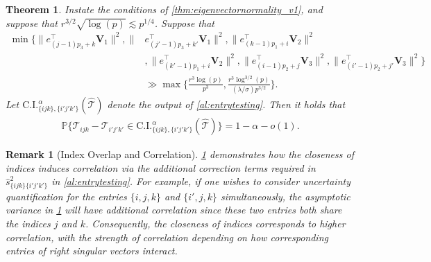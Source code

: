 \documentclass[10pt]{article}
\newcommand{\0}{{\mathbf{0}}}
\newcommand{\1}{{\mathbf{1}}}
\renewcommand{\t}{^{\top}}
\newtheorem{theorem}{Theorem}
\newtheorem{remark}{Remark}
\newcommand{\p}{\mathbb{P}}
\renewcommand{\hat}{\widehat}
\renewcommand{\hat}{\widehat}
\begin{document}
\begin{theorem}\label{thm:entrytesting_v1}
Instate the conditions of \cref{thm:eigenvectornormality_v1}, and suppose that $r^{3/2} \sqrt{\log(p)} \lesssim p^{1/4}$.  
Suppose that  \begin{align*}
 \min\bigg\{ \| e_{(j-1)p_3 + k }\t \mathbf{V}_1\|^2, \|& e_{(j'-1)p_3 + k'}\t \mathbf{V}_1\|^2, \| e_{(k-1)p_1 + i}\t \mathbf{V}_2 \|^2\\
 &, \| e_{(k'-1)p_1 + i}\t \mathbf{V}_2 \|^2, \| e_{(i-1)p_2 + j}\t \mathbf{V}_3 \|^2, \| e_{(i'-1)p_2 + j'}\t \mathbf{V}_3 \|^2 \bigg\} \\
    &\gg \max\bigg\{ \frac{r^{3} \log(p)}{p^3} , \frac{r^{3} \log^{3/2}(p)}{(\lambda/\sigma)p^{3/2}}\bigg\} .
    \end{align*} 
    Let $\mathrm{C.I.}^{\alpha}_{\{ijk\},\{i'j'k'\}}( \mathcal{\hat T}) $ denote the output of \cref{al:entrytesting}.  
Then it holds that
\begin{align*}
   \p\bigg\{ \mathcal{T}_{ijk} - \mathcal{T}_{i'j'k'} \in   \mathrm{C.I.}^{\alpha}_{\{ijk\},\{i'j'k'\}}( \mathcal{\hat T}) \bigg\} =  1- \alpha - o(1).
\end{align*}
\end{theorem}

\begin{remark}[Index Overlap and Correlation]
\cref{thm:entrytesting_v1}  demonstrates how the closeness of indices induces correlation via the additional correction terms required in $\hat s^2_{\{ijk\}\{i'j'k'\}}$ in \cref{al:entrytesting}.  For example, if one wishes to consider uncertainty quantification for the entries $\{i,j,k\}$ and $\{i',j,k\}$ simultaneously, the asymptotic variance in \cref{thm:entrytesting_v1} will have additional correlation since these two entries both share the indices $j$ and $k$.  Consequently, the closeness of indices corresponds to higher correlation, with the strength of correlation depending on how corresponding entries of right singular vectors interact.  
\end{remark}

\end{document}

